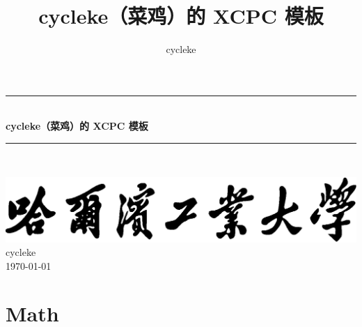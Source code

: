 \documentclass[twoside]{article}
\title{cycleke（菜鸡）的 XCPC 模板}
\author{cycleke}
\newcommand{\HRule}{\rule{\linewidth}{0.5mm}}
\begin{document}
\begin{titlepage}
  \begin{center}
    \HRule{} \\ [1cm]
    \textbf{\Huge{cycleke（菜鸡）的 XCPC 模板}} \\ [0.5cm]
    \HRule{} \\ [4cm]

    \vfill
    \begin{figure}[H]
      \centering
       \quad
    \end{figure}
    \includegraphics[width=.55\linewidth]{school} \\ [2cm]
    \LARGE{cycleke} \\ [1cm]
    \Large{\today}
  \end{center}
  \clearpage
\end{titlepage}

\tableofcontents\clearpage
\pagestyle{fancy}
\lfoot{}
\cfoot{\thepage}\rfoot{}
\setcounter{section}{0}
\setcounter{page}{1}
\clearpage

\section{Math}
\end{document}
